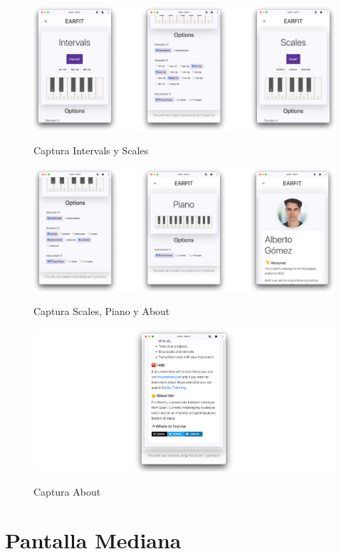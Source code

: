 \documentclass[12pt,twoside,titlepage]{report}
\begin{document}
\begin{figure}[H]
    \centering
    \includegraphics[scale=0.7]{Capturas Earfit/Movil/Movil2}
    \label{fig:Movil2}
    \caption{Captura Intervals y Scales}
\end{figure}

\begin{figure}[H]
    \centering
    \includegraphics[scale=0.7]{Capturas Earfit/Movil/Movil3}
    \label{fig:Movil3}
    \caption{Captura Scales, Piano y About}
\end{figure}

\begin{figure}[H]
    \centering
    \includegraphics[scale=0.7]{Capturas Earfit/Movil/Movil4}
    \label{fig:Movil4}
    \caption{Captura About}
\end{figure}

\section{Pantalla Mediana}
\end{document}
